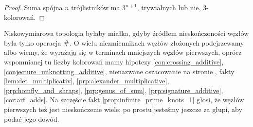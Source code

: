 \begin{proof}
    Suma spójna $n$ trójlistników ma $3^{n+1}$, trywialnych lub nie, $3$-kolorowań.
\end{proof}

Niskowymiarowa topologia byłaby miałka, gdyby źródłem nieskończoności węzłów była tylko operacja $\mathbin{\#}$.
O wielu niezmiennikach węzłów złożonych podejrzewamy albo wiemy, że wyrażają się w terminach mniejszych węzłów pierwszych, oprócz wspomnianej tu liczby kolorowań mamy hipotezy \ref{con:crossing_additive}, \ref{conjecture_unknotting_additive}, nienazwane oszacowanie na stronie \pageref{stick_bounded_factors}, fakty \ref{lem:det_multiplicativ}, \ref{prp:alexander_multiplicative}, \ref{prp:homfly_and_shraps}, \ref{prp:genus_of_sum}, \ref{prp:signature_additive}, \ref{cor:arf_adds}.
Na szczęście fakt \ref{prop:infinite_prime_knots_1} głosi, że węzłów pierwszych też jest nieskończenie wiele; po prostu jesteśmy jeszcze za głupi, aby podać jego dowód.




%

